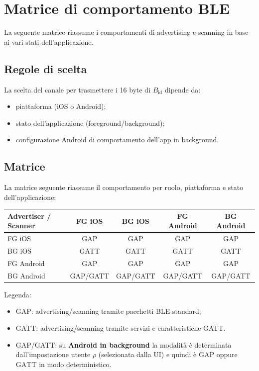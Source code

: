 \documentclass[a4paper,11pt,table,dvipsnames]{article}
\begin{document}
\section{Matrice di comportamento BLE}
La seguente matrice riassume i comportamenti di advertising e scanning in base ai vari stati dell'applicazione.

\subsection{Regole di scelta}
La scelta del canale per trasmettere i 16 byte di \(B_{\text{id}}\) dipende da:
\begin{itemize}
    \item piattaforma (iOS o Android);
    \item stato dell'applicazione (foreground/background);
    \item configurazione Android di comportamento dell'app in background.
\end{itemize}


\subsection{Matrice}
La matrice seguente riassume il comportamento per ruolo, piattaforma e stato dell'applicazione:

\begin{table}[H]
    \centering
    \begin{tabular}{lcccc}
        \toprule
        Advertiser / Scanner & FG iOS   & BG iOS   & FG Android & BG Android \\
        \midrule
        FG iOS               & GAP      & GAP      & GAP        & GAP        \\
        BG iOS               & GATT     & GATT     & GATT       & GATT       \\
        FG Android           & GAP      & GAP      & GAP        & GAP        \\
        BG Android           & GAP/GATT & GAP/GATT & GAP/GATT   & GAP/GATT   \\
        \bottomrule
    \end{tabular}
\end{table}

Legenda:
\begin{itemize}
    \item GAP: advertising/scanning tramite pacchetti BLE standard;
    \item GATT: advertising/scanning tramite servizi e caratteristiche GATT.
    \item GAP/GATT: su \textbf{Android in background} la modalità è determinata dall’impostazione utente \(\rho\) (selezionata dalla UI) e quindi è \(\mathrm{GAP}\) oppure \(\mathrm{GATT}\) in modo deterministico.
\end{itemize}
\end{document}
